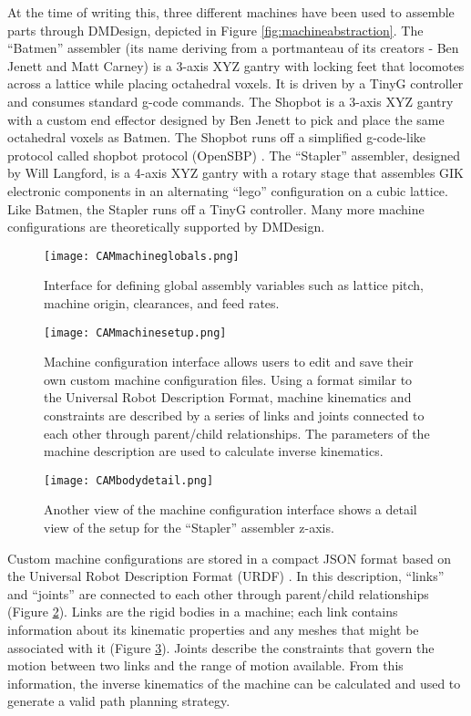 {At the time of writing this, three different machines have been used to assemble parts through DMDesign, depicted in Figure \ref{fig:machineabstraction}.  The ``Batmen'' assembler (its name deriving from a portmanteau of its creators - Ben Jenett and Matt Carney) is a 3-axis XYZ gantry with locking feet that locomotes across a lattice while placing octahedral voxels.  It is driven by a TinyG controller \cite{Synthetos2016} and consumes standard g-code commands.  The Shopbot is a 3-axis XYZ gantry with a custom end effector designed by Ben Jenett to pick and place the same octahedral voxels as Batmen.  The Shopbot runs off a simplified g-code-like protocol called shopbot protocol (OpenSBP) \cite{Shopbot2016}.  The ``Stapler'' assembler, designed by Will Langford, is a 4-axis XYZ gantry with a rotary stage that assembles GIK electronic components in an alternating ``lego'' configuration on a cubic lattice.  Like Batmen, the Stapler runs off a TinyG controller.  Many more machine configurations are theoretically supported by DMDesign.\\

\begin{figure}
  \texttt{[image: CAMmachineglobals.png]}
  \caption{Interface for defining global assembly variables such as lattice pitch, machine origin, clearances, and feed rates.}
  \label{fig:CAMmachineglobals}
\end{figure}

\begin{figure}
  \texttt{[image: CAMmachinesetup.png]}
  \caption{Machine configuration interface allows users to edit and save their own custom machine configuration files.  Using a format similar to the Universal Robot Description Format, machine kinematics and constraints are described by a series of links and joints connected to each other through parent/child relationships.  The parameters of the machine description are used to calculate inverse kinematics.}
  \label{fig:CAMmachinesetup}
\end{figure}

\begin{figure}
  \texttt{[image: CAMbodydetail.png]}
  \caption{Another view of the machine configuration interface shows a detail view of the setup for the ``Stapler'' assembler z-axis.}
  \label{fig:CAMbodydetail}
\end{figure}

Custom machine configurations are stored in a compact JSON format based on the Universal Robot Description Format (URDF) \cite{ROS2016}.  In this description, ``links'' and ``joints'' are connected to each other through parent/child relationships (Figure \ref{fig:CAMmachinesetup}).  Links are the rigid bodies in a machine; each link contains information about its kinematic properties and any meshes that might be associated with it (Figure \ref{fig:CAMbodydetail}).  Joints describe the constraints that govern the motion between two links and the range of motion available.  From this information, the inverse kinematics of the machine can be calculated and used to generate a valid path planning strategy.\\

}
